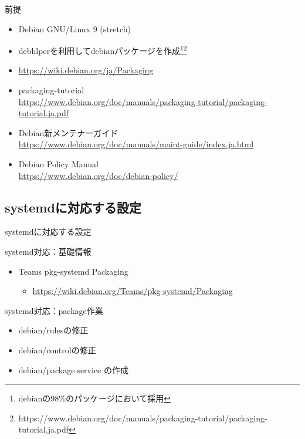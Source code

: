 \begin{frame}[containsverbatim]{前提}
  \begin{itemize}
  \item Debian GNU/Linux 9 (stretch)
  \item debhlperを利用してdebianパッケージを作成\footnote{debianの98\%のパッケージにおいて採用}\footnote{https://www.debian.org/doc/manuals/packaging-tutorial/packaging-tutorial.ja.pdf}
  \item \url{https://wiki.debian.org/ja/Packaging}
  \item packaging-tutorial \\ \url{https://www.debian.org/doc/manuals/packaging-tutorial/packaging-tutorial.ja.pdf}
  \item Debian新メンテナーガイド \\ \url{https://www.debian.org/doc/manuals/maint-guide/index.ja.html}
  \item Debian Policy Manual \\ \url{https://www.debian.org/doc/debian-policy/}
  \end{itemize}
\end{frame}


\subsection{systemdに対応する設定}

\begin{frame}
  \begin{center}\Huge{systemdに対応する設定}\end{center}
\end{frame} 

\begin{frame}[containsverbatim]{systemd対応：基礎情報}
  \begin{itemize}
  \item Teams pkg-systemd Packaging
    \begin{itemize}
    \item \url{https://wiki.debian.org/Teams/pkg-systemd/Packaging}
    \end{itemize}
  \end{itemize}
\end{frame}


\begin{frame}[containsverbatim]{systemd対応：package作業}
  \begin{itemize}
  \item debian/rulesの修正
  \item debian/controlの修正
  \item debian/package.service の作成
  \end{itemize}
\end{frame}

